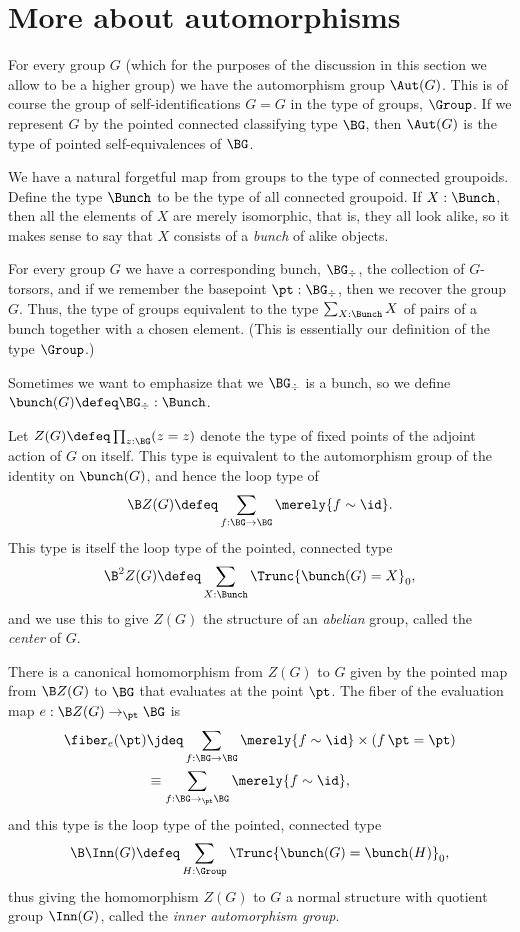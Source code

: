 \section{More about automorphisms}
\label{sec:automorphisms}

For every group $G$ (which for the purposes of the discussion
in this section we allow to be a higher group)
we have the automorphism group $\Aut(G)$.
This is of course the group of self-identifications $G = G$ in the type of groups, $\Group$.
If we represent $G$ by the pointed connected classifying type $\BG$,
then $\Aut(G)$ is the type of pointed self-equivalences of $\BG$.

We have a natural forgetful map from groups to the type of connected groupoids.
Define the type $\Bunch$ to be the type of all connected groupoid.
If $X:\Bunch$, then all the elements of $X$ are merely isomorphic,
that is, they all look alike,
so it makes sense to say that $X$ consists of a \emph{bunch} of alike objects.

For every group $G$ we have a corresponding bunch, $\BG_\div$,
\ie{} the collection of $G$-torsors,
and if we remember the basepoint $\pt : \BG_\div$,
then we recover the group $G$.
Thus, the type of groups equivalent to the type
$\sum_{X : \Bunch} X$
of pairs of a bunch together with a chosen element.
(This is essentially our definition of the type $\Group$.)

Sometimes we want to emphasize that we $\BG_\div$ is a bunch,
so we define $\bunch(G) \defeq \BG_\div : \Bunch$.

\begin{definition}
  \label{def:center}
  Let $Z(G) \defeq \prod_{z : \BG}(z = z)$ denote the type of fixed points of the adjoint action of $G$ on itself.
  This type is equivalent to the automorphism group of the identity on $\bunch(G)$,
  and hence the loop type of
  \[
    \B Z(G) \defeq \sum_{f : \BG \to \BG} \merely{f \sim \id}.
  \]
  This type is itself the loop type of the pointed, connected type
  \[
    \B^2Z(G) \defeq \sum_{X : \Bunch}\Trunc{\bunch(G) = X}_0,
  \]
  and we use this to give $Z(G)$ the structure of an \emph{abelian} group,
  called the \emph{center} of $G$.
\end{definition}
There is a canonical homomorphism from $Z(G)$ to $G$ given by the pointed map
from $\B Z(G)$ to $\BG$ that evaluates at the point $\pt$.
The fiber of the evaluation map $e : \B Z(G) \to_\pt \BG$ is
\begin{align*}
  \fiber_e(\pt)
  &\jdeq \sum_{f : \BG \to \BG} \merely{f \sim \id} \times (\mathop f \pt = \pt) \\
  &\equiv \sum_{f : \BG \to_\pt \BG} \merely{f \sim \id},
\end{align*}
and this type is the loop type of the pointed, connected type
\[
  \B\Inn(G) \defeq \sum_{H : \Group} \Trunc{\bunch(G) = \bunch(H)}_0,
\]
thus giving the homomorphism $Z(G)$ to $G$ a normal structure with
quotient group $\Inn(G)$, called the \emph{inner automorphism group}.

